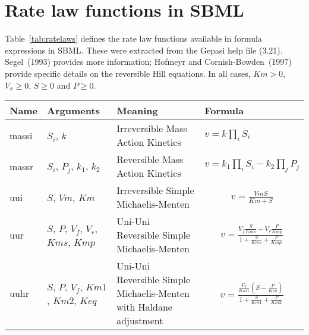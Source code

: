 \documentclass[10pt]{cek-article}
\newcommand{\D}{\displaystyle}
\begin{document}
\section{Rate law functions in SBML}
\label{appendix:ratelaws}

Table~\ref{tab:ratelaws} defines the rate law functions available in
formula expressions in SBML.  These were extracted from the Gepasi help
file (3.21).  Segel~(1993) provides more information; Hofmeyr and
Cornish-Bowden~(1997) provide specific details on the reversible Hill
equations.  In all cases, $Km > 0$, $V_x \geq 0$, $S \geq 0$ and $P \geq
0$.

\begin{table}[ht]
\setlength{\abovedisplayskip}{-2pt}
\setlength{\belowdisplayskip}{1pt}
\begin{tabular}{|m{0.5in}|>{\raggedright}m{0.77in}|>{\raggedright}m{1.5in}|m{3.2in}|}
\hline
\textbf{Name} & \textbf{Arguments} & \textbf{Meaning} &
\textbf{Formula} \\
\hline

massi & $S_i$, $k$ & Irreversible Mass Action Kinetics &
$v = k \prod_i S_i$
\\ \hline

massr & $S_i$, $P_j$, $k_1$, $k_2$ & Reversible Mass Action Kinetics  &
$v = k_1 \prod_i S_i - k_2 \prod_j P_j$
\\ \hline

uui & $S$, $Vm$, $Km$ & Irreversible Simple Michaelis-Menten  &
\begin{gather*}
v = \frac{Vm S}{Km + S}
\end{gather*}
\\ \hline

uur & $S$, $P$, $V_f$, $V_r$, $Kms$, $Kmp$ & Uni-Uni Reversible Simple
Michaelis-Menten &
\begin{gather*}
v = \frac{V_f \frac{\D S}{\D
Kms} - V_r \frac{\D P}{\D Kmp}}{1 + \frac{\D S}{\D Kms} +
\frac{\D P}{\D Kmp} }
\end{gather*}
\\ \hline

uuhr & $S$, $P$, $V_f$, $Km1$, $Km2$, $Keq$ & Uni-Uni
Reversible Simple Michaelis-Menten with Haldane adjustment &
\begin{gather*}
v = \frac{\frac{V_f}{Km1} \left(S -
\frac{P}{Keq} \right)}{1 + \frac{S}{Km1} + \frac{P}{Km2}}
\end{gather*}
\\ \hline


\end{tabular}
\end{table}
\end{document}
